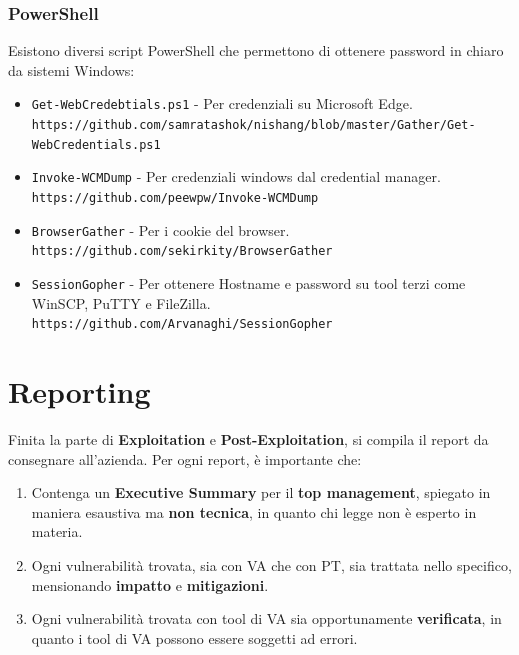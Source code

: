 \documentclass{article}
\begin{document}
\subsubsection{PowerShell}
Esistono diversi script PowerShell che permettono di ottenere password in chiaro da sistemi Windows:
\begin{itemize}
	\item \verb|Get-WebCredebtials.ps1| - Per credenziali su Microsoft Edge.\\ \verb|https://github.com/samratashok/nishang/blob/master/Gather/Get-WebCredentials.ps1|
	
	\item \verb|Invoke-WCMDump| - Per credenziali windows dal credential manager. \\
	\verb|https://github.com/peewpw/Invoke-WCMDump|
	
	\item \verb|BrowserGather| - Per i cookie del browser.\\
	\verb|https://github.com/sekirkity/BrowserGather|
	
	\item \verb|SessionGopher| - Per ottenere Hostname e password su tool terzi come WinSCP, PuTTY e FileZilla.\\
	\verb|https://github.com/Arvanaghi/SessionGopher|
\end{itemize}

\newpage
\section{Reporting}
Finita la parte di \textbf{Exploitation} e \textbf{Post-Exploitation}, si compila il report da consegnare all'azienda. Per ogni report, è importante che:

\begin{enumerate}
	\item Contenga un \textbf{Executive Summary} per il \textbf{top management}, spiegato in maniera esaustiva ma \textbf{non tecnica}, in quanto chi legge non è esperto in materia.
	
	\item Ogni vulnerabilità trovata, sia con VA che con PT, sia trattata nello specifico, mensionando \textbf{impatto} e \textbf{mitigazioni}.
	
	\item Ogni vulnerabilità trovata con tool di VA sia opportunamente \textbf{verificata}, in quanto i tool di VA possono essere soggetti ad errori.
\end{enumerate}
\end{document}
